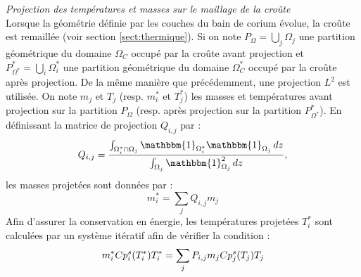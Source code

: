 {\it Projection des températures et masses sur le maillage de la croûte}\\
Lorsque la géométrie définie par les couches du bain de corium évolue, la croûte est remaillée (voir section \ref{sect:thermique}). Si on note $P_{\Omega}=\displaystyle{\bigcup_j} \Omega_j$ une partition géométrique du domaine $\Omega_C$ occupé par la croûte avant projection et $P_{\Omega^*}^*=\displaystyle{\bigcup_i} \Omega_i^*$ une partition géométrique du domaine $\Omega_C^*$ occupé par la croûte après projection. De la même manière que précédemment, une projection $L^2$ est utilisée.
On note $m_j$ et $T_j$ (resp. $m_i^*$ et $T_j^*$) les masses et températures avant projection sur la partition $P_{\Omega}$ (resp. après projection sur la partition $P_{\Omega^*}^*$). En définissant la matrice de projection $Q_{i,j}$ par :
$$Q_{i,j}=\frac{\int_{\Omega_i^*\cap\Omega_j}{\mathbbm{1}}_{\Omega_i^*}{\mathbbm{1}}_{\Omega_j}\, dz}{ \int_{\Omega_j}{\mathbbm{1}}_{\Omega_j}^2\, dz},$$ les masses projetées sont données par :
$$m_i^*=\sum_j Q_{i,j} m_j$$
Afin d'assurer la conservation en énergie, les températures projetées $T_i^*$ sont calculées par un système itératif afin de vérifier la condition :
$$m_i^* \heatCp[s]{i}(T_i^*) T_i^* = \sum_j P_{i,j} m_j \heatCp[s]{j} (T_j) T_j$$